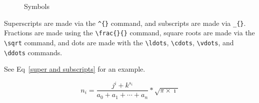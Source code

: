 \documentclass[letterpaper]{article}
\begin{document}
\begin{figure}[htb]
\subfloat[Delimiters]
{
\label{Delimiters}
\begin{tabular}{|c|c|c|} \hline
$($         & $)$           & $\uparrow$        \\ \hline
$[$         & $]$           & $\downarrow$      \\ \hline
$\{$        & $\}$          & $\updownarrow$    \\ \hline
$\lfloor$   & $\rfloor$     & $\Uparrow$        \\ \hline
$\lceil$    & $\rceil$      & $\Downarrow$      \\ \hline
$\langle$   & $\rangle$     & $\Updownarrow$    \\ \hline
$/$         & $\backslash$  &                   \\ \hline
$|$         & $\|$          &                   \\ \hline
\end{tabular}
}

\caption{Symbols}
\label{Symbols}
\end{figure}

Superscripts are made via the \verb+^{}+ command, and subscripts are 
made via \verb+_{}+.  Fractions are made using the \verb+\frac{}{}+ 
command, square roots are made via the \verb+\sqrt+ command, and dots 
are made with the \verb+\ldots+, \verb+\cdots+, \verb+\vdots+, and 
\verb+\ddots+ commands.

See Eq~\ref{super and subscripts} for an example.

\begin{equation}
\label{super and subscripts}
n_{i} = \frac{j^{i} + k^{s_{i}}}{a_{0} + a_{1} + \cdots + a_{n}} *\sqrt{\pi \times \imath}
\end{equation}
\end{document}
